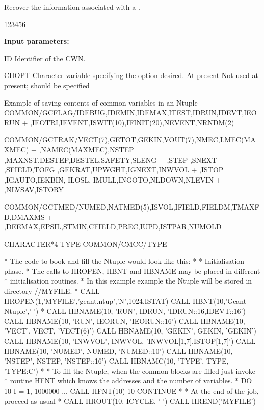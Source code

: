 
\Action Recover the information associated with a \CWN{}.

\begin{DLttc}{123456}
\item[{\rm\bf Input parameters:}]
\item[ID]    Identifier of the CWN{}.
\item[CHOPT] Character variable specifying the option desired.
             At present Not used at present; 
             should be specified
\end{DLttc}


\begin{XMPt}{Example of saving contents of common variables in an Ntuple}
        COMMON/GCFLAG/IDEBUG,IDEMIN,IDEMAX,ITEST,IDRUN,IDEVT,IEORUN
       +        ,IEOTRI,IEVENT,ISWIT(10),IFINIT(20),NEVENT,NRNDM(2)

        COMMON/GCTRAK/VECT(7),GETOT,GEKIN,VOUT(7),NMEC,LMEC(MAXMEC)
       + ,NAMEC(MAXMEC),NSTEP ,MAXNST,DESTEP,DESTEL,SAFETY,SLENG
       + ,STEP  ,SNEXT ,SFIELD,TOFG  ,GEKRAT,UPWGHT,IGNEXT,INWVOL
       + ,ISTOP ,IGAUTO,IEKBIN, ILOSL, IMULL,INGOTO,NLDOWN,NLEVIN
       + ,NLVSAV,ISTORY

        COMMON/GCTMED/NUMED,NATMED(5),ISVOL,IFIELD,FIELDM,TMAXFD,DMAXMS
       +      ,DEEMAX,EPSIL,STMIN,CFIELD,PREC,IUPD,ISTPAR,NUMOLD

        CHARACTER*4 TYPE
        COMMON/CMCC/TYPE

*     The code to book and fill the Ntuple would look like this:
*
*   Initialisation phase.
*   The calls to HROPEN, HBNT and HBNAME may be placed in different
*   initialisation routines.
*   In this example example the Ntuple will be stored in directory //MYFILE.
*
        CALL HROPEN(1,'MYFILE','geant.ntup','N',1024,ISTAT)
        CALL HBNT(10,'Geant Ntuple',' ')
*
        CALL HBNAME(10, 'RUN',    IDRUN,  'IDRUN::16,IDEVT::16')
        CALL HBNAME(10, 'RUN',    IEORUN, 'IEORUN::16')
        CALL HBNAME(10, 'VECT',   VECT,   'VECT(6)')
        CALL HBNAME(10, 'GEKIN',  GEKIN,  'GEKIN')
        CALL HBNAME(10, 'INWVOL', INWVOL, 'INWVOL[1,7],ISTOP[1,7]')
        CALL HBNAME(10, 'NUMED',  NUMED,  'NUMED::10')
        CALL HBNAME(10, 'NSTEP',  NSTEP,  'NSTEP::16')
        CALL HBNAMC(10, 'TYPE',   TYPE,   'TYPE:C')
*
*    To fill the Ntuple, when the common blocks are filled just invoke
*    routine HFNT which knows the addresses and the number of variables.
*
        DO 10 I = 1, 1000000
           ...
           CALL HFNT(10)
10      CONTINUE
*
*                      At the end of the job, proceed as usual
*
        CALL HROUT(10, ICYCLE, ' ')
        CALL HREND('MYFILE')

\end{XMPt}


